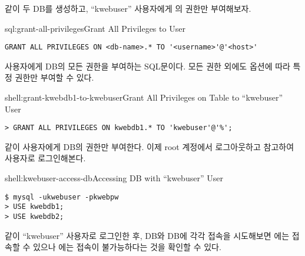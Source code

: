 \와 같이 두 DB를 생성하고, ``kwebuser'' 사용자에게 의 권한만 부여해보자.

\begin{sql}{sql:grant-all-privileges}{Grant All Privileges to User}
\begin{verbatim}
GRANT ALL PRIVILEGES ON <db-name>.* TO '<username>'@'<host>'
\end{verbatim}
\end{sql}

\는 사용자에게  DB의 모든 권한을 부여하는 SQL문이다. 모든 권한 외에도 옵션에 따라 특정 권한만 부여할 수 있다.

\begin{shell}{shell:grant-kwebdb1-to-kwebuser}{Grant All Privileges on  Table to ``kwebuser'' User}
\begin{verbatim}
> GRANT ALL PRIVILEGES ON kwebdb1.* TO 'kwebuser'@'%';
\end{verbatim}
\end{shell}

\와 같이  사용자에게  DB의 권한만 부여한다. 이제 root 계정에서 로그아웃하고 \을 참고하여  사용자로 로그인해본다.

\begin{shell}{shell:kwebuser-access-db}{Accessing DB with ``kwebuser'' User}
\begin{verbatim}
$ mysql -ukwebuser -pkwebpw
> USE kwebdb1;
> USE kwebdb2;
\end{verbatim}
\end{shell}

\와 같이 ``kwebuser'' 사용자로 로그인한 후,  DB와  DB에 각각 접속을 시도해보면 에는 접속할 수 있으나 에는 접속이 불가능하다는 것을 확인할 수 있다.

